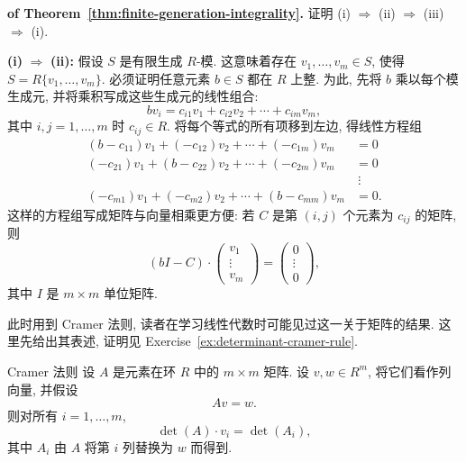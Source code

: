 \begin{Proof}\textbf{of Theorem~\ref{thm:finite-generation-integrality}.}\quad
  证明 (i) $\Rightarrow$ (ii) $\Rightarrow$ (iii) $\Rightarrow$ (i).

  \textbf{(i)} $\Rightarrow$ \textbf{(ii):} 假设 $S$ 是有限生成 $R$-模. 这意味着存在 $v_{1},\ldots,v_{m}\in S$, 使得 $S=R\{v_{1},\ldots,v_{m}\}$. 必须证明任意元素 $b\in S$ 都在 $R$ 上整. 为此, 先将 $b$ 乘以每个模生成元, 并将乘积写成这些生成元的线性组合:
  \[
    bv_{i}=c_{i1}v_{1}+c_{i2}v_{2}+\cdots+c_{im}v_{m},
  \]
  其中 $i,j=1,\ldots,m$ 时 $c_{ij}\in R$. 将每个等式的所有项移到左边, 得线性方程组
  \[
    \begin{aligned}
      (b-c_{11})v_{1}+(-c_{12})v_{2}+\cdots+(-c_{1m})v_{m}&=0\\
      (-c_{21})v_{1}+(b-c_{22})v_{2}+\cdots+(-c_{2m})v_{m}&=0\\
      &\ \vdots\\
      (-c_{m1})v_{1}+(-c_{m2})v_{2}+\cdots+(b-c_{mm})v_{m}&=0.
    \end{aligned}
  \]
  这样的方程组写成矩阵与向量相乘更方便: 若 $C$ 是第 $(i,j)$ 个元素为 $c_{ij}$ 的矩阵, 则
  \begin{equation}\label{eq:module-generators-matrix-system}
    (bI-C)\cdot
    \begin{pmatrix}v_{1}\\\vdots\\v_{m}\end{pmatrix}
    =\begin{pmatrix}0\\\vdots\\0\end{pmatrix},
  \end{equation}
  其中 $I$ 是 $m\times m$ 单位矩阵.

  此时用到 Cramer 法则, 读者在学习线性代数时可能见过这一关于矩阵的结果. 这里先给出其表述, 证明见 Exercise~\ref{ex:determinant-cramer-rule}.

  \begin{Lemma}{Cramer 法则}\leavevmode\label{lem:cramers-rule-over-ring}
    设 $A$ 是元素在环 $R$ 中的 $m\times m$ 矩阵. 设 $v,w\in R^{m}$, 将它们看作列向量, 并假设
    \[
      Av=w.
    \]
    则对所有 $i=1,\ldots,m$,
    \[
      \det(A)\cdot v_{i}=\det(A_{i}),
    \]
    其中 $A_{i}$ 由 $A$ 将第 $i$ 列替换为 $w$ 而得到.
  \end{Lemma}


\end{Proof}
